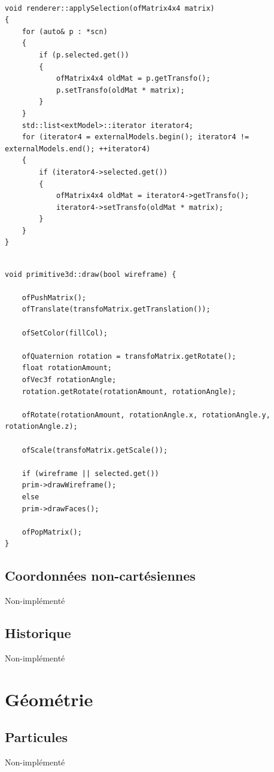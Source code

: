 \begin{lstlisting}

void renderer::applySelection(ofMatrix4x4 matrix)
{
	for (auto& p : *scn)
	{
		if (p.selected.get())
		{
			ofMatrix4x4 oldMat = p.getTransfo();
			p.setTransfo(oldMat * matrix);
		}
	}
	std::list<extModel>::iterator iterator4;
	for (iterator4 = externalModels.begin(); iterator4 != externalModels.end(); ++iterator4)
	{
		if (iterator4->selected.get())
		{
			ofMatrix4x4 oldMat = iterator4->getTransfo();
			iterator4->setTransfo(oldMat * matrix);
		}
	}
}
\end{lstlisting}

\begin{lstlisting}

void primitive3d::draw(bool wireframe) {

	ofPushMatrix();
	ofTranslate(transfoMatrix.getTranslation());
	
	ofSetColor(fillCol);
	
	ofQuaternion rotation = transfoMatrix.getRotate();
	float rotationAmount;
	ofVec3f rotationAngle;
	rotation.getRotate(rotationAmount, rotationAngle);
	
	ofRotate(rotationAmount, rotationAngle.x, rotationAngle.y, rotationAngle.z);
	
	ofScale(transfoMatrix.getScale());
	
	if (wireframe || selected.get())
	prim->drawWireframe();
	else
	prim->drawFaces();
	
	ofPopMatrix();
}

\end{lstlisting}

\subsection{Coordonnées non-cartésiennes}
Non-implémenté

\subsection{Historique}
Non-implémenté

\pagebreak
\section{Géométrie}
\subsection{Particules}
Non-implémenté


